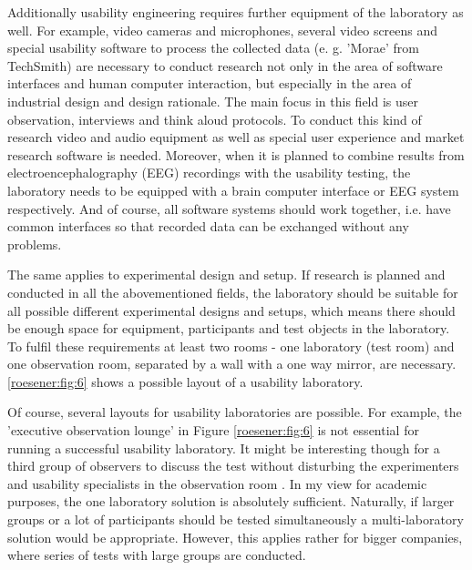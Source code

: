 \documentclass[output=paper]{langsci/langscibook}
\begin{document}
Additionally usability engineering requires further equipment of the laboratory as well. For example, video cameras and microphones, several video screens and special usability software to process the collected data (e. g. 'Morae' from TechSmith) are necessary to conduct research not only in the area of software interfaces and human computer interaction, but especially in the area of industrial design and design rationale. The main focus in this field is user observation, interviews and think aloud protocols. To conduct this kind of research video and audio equipment as well as special user experience and market research software is needed. Moreover, when it is planned to combine results from electroencephalography (EEG) recordings with the usability testing, the laboratory needs to be equipped with a brain computer interface or EEG system respectively. And of course, all software systems should work together, i.e. have common interfaces so that recorded data can be exchanged without any problems.



The same applies to experimental design and setup. If research is planned and conducted in all the abovementioned fields, the laboratory should be suitable for all possible different experimental designs and setups, which means there should be enough space for equipment, participants and test objects in the laboratory. To fulfil these requirements at least two rooms - one laboratory (test room) and one observation room, separated by a wall with a one way mirror, are necessary. \ref{roesener:fig:6} shows a possible layout of a usability laboratory.



Of course, several layouts for usability laboratories are possible. For example, the 'executive observation lounge' in Figure \ref{roesener:fig:6} is not essential for running a successful usability laboratory. It might be interesting though for a third group of observers to discuss the test without disturbing the experimenters and usability specialists in the observation room \citep[cf.][pp. 203ff.]{nielsen1993}. In my view for academic purposes, the one laboratory solution is absolutely sufficient. Naturally, if larger groups or a lot of participants should be tested simultaneously a multi-laboratory solution would be appropriate. However, this applies rather for bigger companies, where series of tests with large groups are conducted.
\end{document}
